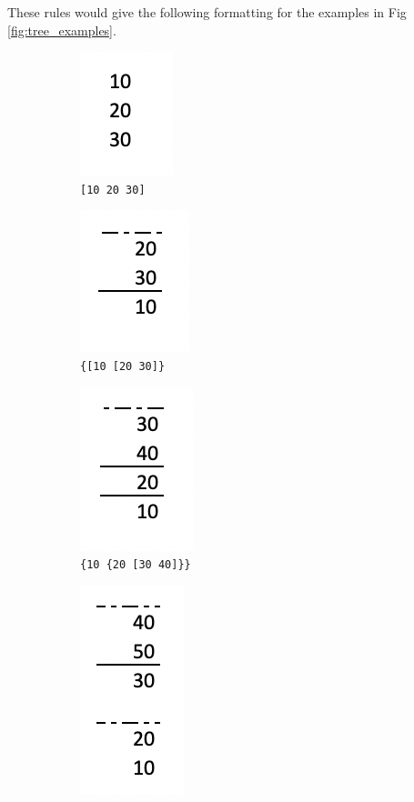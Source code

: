 \documentclass[11pt]{article}
\begin{document}
These rules would give the following formatting for the examples in Fig \ref{fig:tree_examples}.

\begin{figure}[h] 
\centering
	\begin{subfigure}[b]{.3\textwidth}
		\centering
		\includegraphics[scale=.5]{screenshots/format1.png}
		\caption{{\texttt{[10 20 30]}}}\label{fig:fa}
	\end{subfigure}	
  	\begin{subfigure}[b]{.3\textwidth}
  		\centering
    		\includegraphics[scale=.5]{screenshots/format2.png}
    		\caption{\texttt{\{[10 [20 30]\}}}\label{fig:fb}
    \end{subfigure}
    \begin{subfigure}[b]{.3\textwidth}
    		\centering
    		\includegraphics[scale=.5]{screenshots/format3.png}
    		\caption{\texttt{\{10 \{20 [30 40]\}\}}}\label{fig:fc}
    \end{subfigure}
    \begin{subfigure}[b]{.45\textwidth}
    		\centering
    		\includegraphics[scale=.5]{screenshots/format4.png}

\end{subfigure}
\end{figure}
\end{document}
